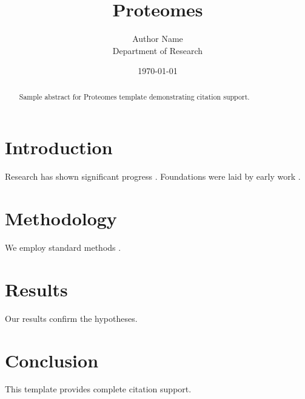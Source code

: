\documentclass{mdpi}
\title{Proteomes}
\author{Author Name \\ \small Department of Research}
\date{\today}
\begin{document}
\maketitle

\begin{abstract}
Sample abstract for Proteomes template demonstrating citation support.
\end{abstract}

\section{Introduction}
Research has shown significant progress \citep{einstein1905}. Foundations were laid by early work \citep{turing1950}.

\section{Methodology}
We employ standard methods \citep{knuth1984}.

\section{Results}
Our results confirm the hypotheses.

\section{Conclusion}
This template provides complete citation support.



\end{document}

